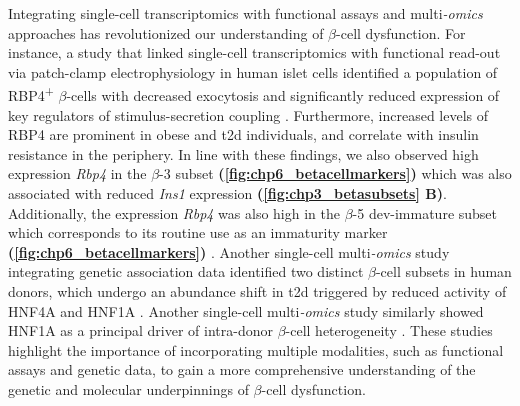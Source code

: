 \par Integrating single-cell transcriptomics with functional assays and multi\textit{-omics} approaches has revolutionized our understanding of $\beta$-cell dysfunction. For instance, a study that linked single-cell transcriptomics with functional read-out via patch-clamp electrophysiology in human islet cells identified a population of RBP4\textsuperscript{+} $\beta$-cells with decreased exocytosis and significantly reduced expression of key regulators of stimulus-secretion coupling \textbf{\cite{camunas-soler_patch-seq_2020}}. Furthermore, increased levels of RBP4 are prominent in obese and \gls{t2d} individuals, and correlate with insulin resistance in the periphery. In line with these findings, we also observed high expression \textit{Rbp4} in the $\beta$-3 subset \textbf{(\autoref{fig:chp6_betacellmarkers})} which was also associated with reduced \textit{Ins1} expression \textbf{(\autoref{fig:chp3_betasubsets} B)}. Additionally, the expression \textit{Rbp4} was also high in the $\beta$-5 dev-immature subset which corresponds to its routine use as an immaturity marker \textbf{(\autoref{fig:chp6_betacellmarkers})} \textbf{\cite{camunas-soler_patch-seq_2020,salinno_cd81_2021,hrovatin_delineating_2023}}. Another single-cell multi\textit{-omics} study integrating genetic association data identified two distinct $\beta$-cell subsets in human donors, which undergo an abundance shift in \gls{t2d} triggered by reduced activity of HNF4A and HNF1A \textbf{\cite{wang_integrating_2023}}. Another single-cell multi\textit{-omics} study similarly showed HNF1A as a principal driver of intra-donor $\beta$-cell heterogeneity \textbf{\cite{weng_single_2023}}. These studies highlight the importance of  incorporating multiple modalities, such as functional assays and genetic data, to gain a more comprehensive understanding of the genetic and molecular underpinnings of $\beta$-cell dysfunction.\\



